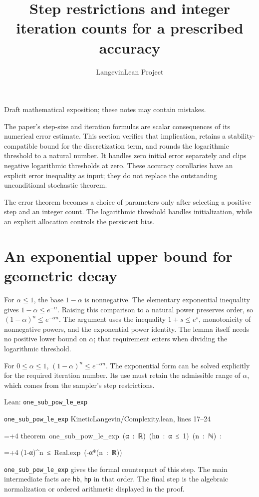 \documentclass[11pt,a4paper]{article}
\title{\texorpdfstring{Step restrictions and integer iteration counts for a prescribed accuracy}{Step restrictions and integer iteration counts for a prescribed accuracy}}
\author{LangevinLean Project}
\date{}
\newlength{\leancharwidth}
\newenvironment{leancode}{\par\smallskip\begingroup\ttfamily\footnotesize\raggedright
  \settowidth{\leancharwidth}{M}\setlength{\parskip}{0pt}\setlength{\parindent}{0pt}
  \frenchspacing}{\par\endgroup\smallskip}
\newcommand{\leanline}[2]{\hangindent=\dimexpr#1\leancharwidth+4\leancharwidth\relax
  \hangafter=1\noindent\hspace*{#1\leancharwidth}#2\par}
\newcommand{\leansource}[1]{\par{\footnotesize\color{leanmuted}#1}\par}
\newcommand{\leanlabel}[1]{\par\smallskip\noindent{\small\bfseries #1}\par}
\begin{document}
\maketitle
Draft mathematical exposition; these notes may contain mistakes.


The paper's step-size and iteration formulas are scalar consequences of its numerical error estimate. This section verifies that implication, retains a stability-compatible bound for the discretization term, and rounds the logarithmic threshold to a natural number. It handles zero initial error separately and clips negative logarithmic thresholds at zero. These accuracy corollaries have an explicit error inequality as input; they do not replace the outstanding unconditional stochastic theorem.



The error theorem becomes a choice of parameters only after selecting a positive step and an integer count. The logarithmic threshold handles initialization, while an explicit allocation controls the persistent bias.


\section{\texorpdfstring{An exponential upper bound for geometric decay}{An exponential upper bound for geometric decay}}


For \(\alpha\le1\), the base \(1-\alpha\) is nonnegative. The elementary exponential inequality gives \(1-\alpha\le e^{-\alpha}\). Raising this comparison to a natural power preserves order, so \((1-\alpha)^n\le e^{-\alpha n}\). The argument uses the inequality \(1+s\le e^s\), monotonicity of nonnegative powers, and the exponential power identity. The lemma itself needs no positive lower bound on \(\alpha\); that requirement enters when dividing the logarithmic threshold.



For \(0\le\alpha\le1\), \((1-\alpha)^n\le e^{-\alpha n}\). The exponential form can be solved explicitly for the required iteration number. Its use must retain the admissible range of \(\alpha\), which comes from the sampler’s step restrictions.

\begin{leanbox}{Lean: \texttt{one\_\allowbreak{}sub\_\allowbreak{}pow\_\allowbreak{}le\_\allowbreak{}exp}}
\leansource{\texttt{one\_\allowbreak{}sub\_\allowbreak{}pow\_\allowbreak{}le\_\allowbreak{}exp} \quad KineticLangevin/\allowbreak{}Complexity.lean, lines 17–24}
\begin{leancode}
\leanline{0}{theorem\ one\_sub\_pow\_le\_exp\ (α\ :\ ℝ)\ (hα\ :\ α\ ≤\ 1)\ (n\ :\ ℕ)\ :}
\leanline{4}{(1-α)\textasciicircum{}n\ ≤\ Real.exp\ (-α*(n\ :\ ℝ))}
\end{leancode}
\leanlabel{How the Lean proof follows the argument}
\texttt{one\_\allowbreak{}sub\_\allowbreak{}pow\_\allowbreak{}le\_\allowbreak{}exp} gives the formal counterpart of this step. The main intermediate facts are \texttt{hb}, \texttt{hp} in that order. The final step is the algebraic normalization or ordered arithmetic displayed in the proof.
\end{leanbox}
\end{document}
